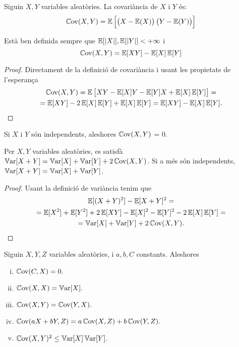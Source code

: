 \begin{defi}[covariància]
    Siguin $X, Y$ variables aleatòries. La covariància de $X$ i $Y$ \'es:
    \[
        \cov(X, Y) = \esp \left[\lp X - \esp(X) \rp \lp Y - \esp(Y) \rp \right]
    \]
\end{defi}

\begin{obs}
    Està ben definida sempre que $\esp[|X|], \esp[|Y|] < +\infty$ i
    \[
        \cov(X, Y) = \esp[XY] - \esp[X]\esp[Y]
    \]
\end{obs}

\begin{proof}
    Directament de la definició de covariància i usant les propietats de l'esperança
    \begin{gather*} 
        \cov(X,Y) = \esp\left[XY - \esp[X]Y - \esp[Y]X + \esp[X]\esp[Y]\right] = \\
        = \esp[XY] - 2\esp[X]\esp[Y] + \esp[X]\esp[Y] 
        = \esp[XY] - \esp[X]\esp[Y].
    \end{gather*} 
\end{proof}

\begin{obs}
    Si $X$ i $Y$ són independents, aleshores $\cov(X,Y)$ = 0.
\end{obs}

\begin{obs}
    Per $X, Y$ variables aleatòries, es satisfà $\var[X + Y] = \var[X] + \var[Y] 
    + 2 \cov(X, Y)$. Si a m\'es són independents, $\var[X+Y] = \var[X] + \var[Y]$.
\end{obs}

\begin{proof}
    Usant la definició de variància tenim que
    \begin{gather*} 
        \esp[(X+Y)^2] - \esp[X+Y]^2 =\\
        = \esp[X^2] + \esp[Y^2] + 2\esp[XY] - \esp[X]^2
        - \esp[Y]^2 - 2\esp[X]\esp[Y] =\\
        = \var[X] + \var[Y] + 2\cov(X, Y).
    \end{gather*} 
\end{proof}

\begin{prop}
    Siguin $X, Y, Z$ variables aleatòries, i $a, b, C$  constants. Aleshores
    \begin{enumerate}[i)]
    \item $\cov(C, X) = 0.$
    \item $\cov(X, X) = \var[X].$
    \item $\cov(X, Y) = \cov(Y, X).$
    \item $\cov(aX + bY, Z) = a \cov(X,Z) + b\cov(Y, Z).$
    \item $\cov(X, Y)^2 \leq \var[X]\var[Y].$
    \end{enumerate}
\end{prop}

